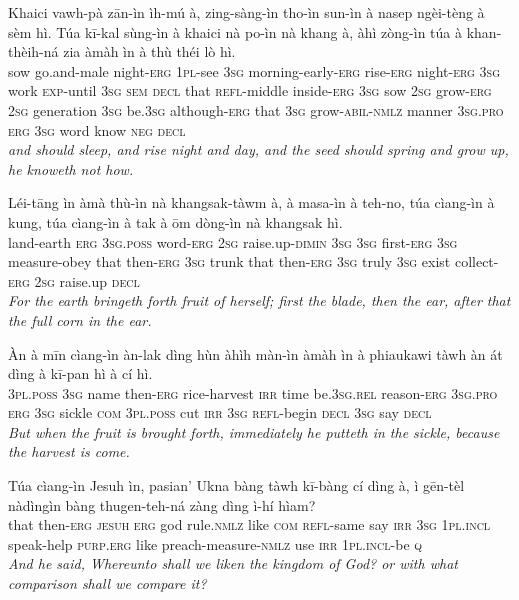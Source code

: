\documentclass[11pt,a4paper]{article}
\begin{document}
\begin{exe}
\gll Khaici vawh-pà zān-ìn ìh-mú à, zing-sàng-ìn tho-ìn sun-ìn à nasep ngèi-tèng à sèm hì. Túa kī-kal sùng-ìn à khaici nà po-ìn nà khang à, àhì zòng-ìn túa à khan-thèih-ná zia àmàh ìn à thù théi lò hì. \\
     sow go.and-male night-\textsc{erg} \textsc{1pl}-see \textsc{3sg} morning-early-\textsc{erg} rise-\textsc{erg} night-\textsc{erg} \textsc{3sg} work \textsc{exp}-until \textsc{3sg} \textsc{sem} \textsc{decl} that \textsc{refl}-middle inside-\textsc{erg} \textsc{3sg} sow \textsc{2sg} grow-\textsc{erg} \textsc{2sg} generation \textsc{3sg} be.\textsc{3sg} although-\textsc{erg} that \textsc{3sg} grow-\textsc{abil}-\textsc{nmlz} manner \textsc{3sg}.\textsc{pro} \textsc{erg} \textsc{3sg} word know \textsc{neg} \textsc{decl} \\
\glt \textcolor{kjvcolor}{\textit{and should sleep, and rise night and day, and the seed should spring and grow up, he knoweth not how.}}

\gll Léi-tāng ìn àmà thù-ìn nà khangsak-tàwm à, à masa-ìn à teh-no, túa cìang-ìn à kung, túa cìang-ìn à tak à ōm dòng-ìn nà khangsak hì. \\
     land-earth \textsc{erg} \textsc{3sg}.\textsc{poss} word-\textsc{erg} \textsc{2sg} raise.up-\textsc{dimin} \textsc{3sg} \textsc{3sg} first-\textsc{erg} \textsc{3sg} measure-obey that then-\textsc{erg} \textsc{3sg} trunk that then-\textsc{erg} \textsc{3sg} truly \textsc{3sg} exist collect-\textsc{erg} \textsc{2sg} raise.up \textsc{decl} \\
\glt \textcolor{kjvcolor}{\textit{For the earth bringeth forth fruit of herself; first the blade, then the ear, after that the full corn in the ear.}}

\gll Àn à mīn cìang-ìn àn-lak dìng hùn àhìh màn-ìn àmàh ìn à phiaukawi tàwh àn át dìng à kī-pan hì à cí hì. \\
     \textsc{3pl}.\textsc{poss} \textsc{3sg} name then-\textsc{erg} rice-harvest \textsc{irr} time be.\textsc{3sg}.\textsc{rel} reason-\textsc{erg} \textsc{3sg}.\textsc{pro} \textsc{erg} \textsc{3sg} sickle \textsc{com} \textsc{3pl}.\textsc{poss} cut \textsc{irr} \textsc{3sg} \textsc{refl}-begin \textsc{decl} \textsc{3sg} say \textsc{decl} \\
\glt \textcolor{kjvcolor}{\textit{But when the fruit is brought forth, immediately he putteth in the sickle, because the harvest is come.}}

\gll Túa cìang-ìn Jesuh ìn, pasian' Ukna bàng tàwh kī-bàng cí dìng à, ì gēn-tèl nàdìngìn bàng thugen-teh-ná zàng dìng ì-hí hìam? \\
     that then-\textsc{erg} \textsc{jesuh} \textsc{erg} god rule.\textsc{nmlz} like \textsc{com} \textsc{refl}-same say \textsc{irr} \textsc{3sg} \textsc{1pl}.\textsc{incl} speak-help \textsc{purp}.\textsc{erg} like preach-measure-\textsc{nmlz} use \textsc{irr} \textsc{1pl}.\textsc{incl}-be \textsc{q} \\
\glt \textcolor{kjvcolor}{\textit{And he said, Whereunto shall we liken the kingdom of God? or with what comparison shall we compare it?}}


\end{exe}
\end{document}
